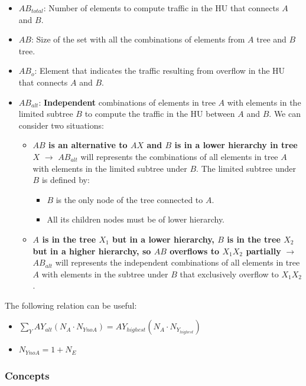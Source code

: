 \documentclass[
	12pt,
	twoside
]{book}
\begin{document}
\begin{itemize}
	\item $AB_{total}$: Number of elements to compute traffic in the HU that connects $A$ and $B$.
	\item $AB$: Size of the set with all the combinations of elements from $A$ tree and $B$ tree.
	\item $AB_o$: Element that indicates the traffic resulting from overflow in the HU that connects $A$ and $B$.
	\item {
		$AB_{alt}$: \textbf{Independent} combinations of elements in tree $A$ with elements in the limited subtree $B$ to compute the traffic in the HU between $A$ and $B$. We can consider two situations:
		\begin{itemize}
			\item {
				\textbf{$AB$ is an alternative to $AX$ and $B$ is in a lower hierarchy in tree $X$} $\rightarrow$ $AB_{alt}$ will represents the combinations of all elements in tree $A$ with elements in the limited subtree under $B$. The limited subtree under $B$ is defined by:
				\begin{itemize}
					\item $B$ is the only node of the tree connected to $A$.
					\item All its children nodes must be of lower hierarchy.
				\end{itemize}
			}
			\item {
				\textbf{$A$ is in the tree $X_1$ but in a lower hierarchy, $B$ is in the tree $X_2$ but in a higher hierarchy, so $AB$ overflows to $X_1 X_2$ partially} $\rightarrow$ $AB_{alt}$ will represents the independent combinations of all elements in tree $A$ with elements in the subtree under $B$ that exclusively overflow to $X_1 X_2$.
			}
		\end{itemize}
	}
\end{itemize}

The following relation can be useful:

\begin{itemize}
	\item $\sum_Y AY_{alt} (N_A \cdot N_{YnoA}) = AY_{highest} (N_A \cdot N_{Y_{highest}})$
	\item $N_{YnoA} = 1 + N_E$
\end{itemize}

\subsubsection{Concepts}
\end{document}
